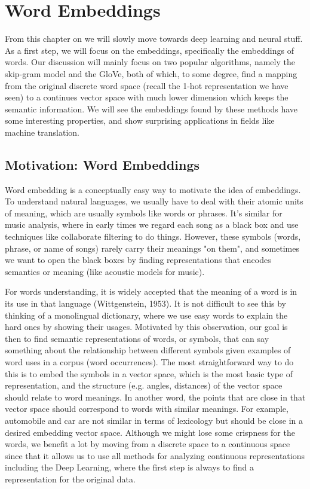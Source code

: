 \documentclass[../book-template.tex]{subfiles}
\begin{document}
\chapter{Word Embeddings}
From this chapter on we will slowly move towards deep learning and neural stuff. As a first step, we will focus on the embeddings, specifically the embeddings of words. Our discussion will mainly focus on two popular algorithms, namely the skip-gram model and the GloVe, both of which, to some degree, find a mapping from the original discrete word space (recall the 1-hot representation we have seen) to a continues vector space with much lower dimension which keeps the semantic information. We will see the embeddings found by these methods have some interesting properties, and show surprising applications in fields like machine translation.
\section{Motivation: Word Embeddings}
Word embedding is a conceptually easy way to motivate the idea of embeddings. To understand natural languages, we usually have to deal with their atomic units of meaning, which are usually symbols like words or phrases. It's similar for music analysis, where in early times we regard each song as a black box and use techniques like collaborate filtering to do things. However, these symbols (words, phrase, or name of songs) rarely carry their meanings "on them", and sometimes we want to open the black boxes by finding representations that encodes semantics or meaning (like acoustic models for music). 
\par For words understanding, it is widely accepted that the meaning of a word is in its use in that language (Wittgenstein, 1953). It is not difficult to see this by thinking of a monolingual dictionary, where we use easy words to explain the hard ones by showing their usages. Motivated by this observation, our goal is then to find semantic representations of words, or symbols, that can say something about the relationship between different symbols given examples of word uses in a corpus (word occurrences). The most straightforward way to do this is to embed the symbols in a vector space, which is the most basic type of representation, and the structure (e.g. angles, distances) of the vector space should relate to word meanings. In another word, the points that are close in that vector space should correspond to words with similar meanings. For example, automobile and car are not similar in terms of lexicology but should be close in a desired embedding vector space. Although we might lose some crispness for the words, we benefit a lot by moving from a discrete space to a continuous space since that it allows us to use all methods for analyzing continuous representations including the Deep Learning, where the first step is always to find a representation for the original data. 
\end{document}
